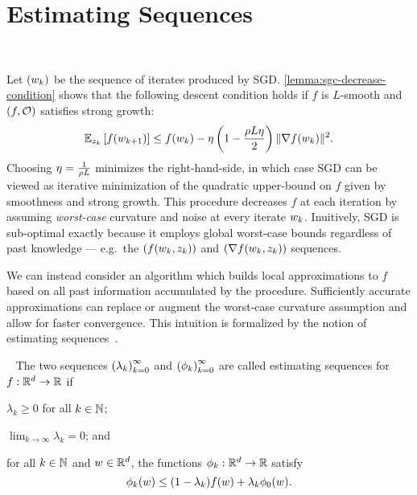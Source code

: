 \section{Estimating Sequences}~\label{sec:estimating-sequences}

Let \( \seq{\wk} \) be the sequence of iterates produced by \ac{SGD}.\@
\autoref{lemma:sgc-decrease-condition} shows that the following descent condition holds if \( f \) is \( L \)-smooth and \( \rbr{f, \oracle{}} \) satisfies strong growth:
\[ \Ek\sbr{f(\wkk)} \leq f(\wk) - \eta \rbr{1 - \frac{\sgc L \eta}{2}}\norm{\grad(\wk)}^2. \]
Choosing \( \eta = \frac{1}{\sgc L} \) minimizes the right-hand-side, in which case \ac{SGD} can be viewed as iterative minimization of the quadratic upper-bound on \( f \) given by smoothness and strong growth. 
This procedure decreases \( f \) at each iteration by assuming \emph{worst-case} curvature and noise at every iterate \( \wk \). 
Inuitively, \ac{SGD} is sub-optimal exactly because it employs global worst-case bounds regardless of past knowledge --- e.g.\ the \( \seq{f(\wk, \zk)} \) and \( \seq{\grad(\wk, \zk)} \) sequences. 

We can instead consider an algorithm which builds local approximations to \( f \) based on all past information accumulated by the procedure.
Sufficiently accurate approximations can replace or augment the worst-case curvature assumption and allow for faster convergence. 
This intuition is formalized by the notion of estimating sequences~\citep{nesterov2004lectures}.

\begin{definition}~\label{def:estimating_sequences}
    The two sequences \( \seq{\lambda_k}_{k=0}^\infty \) and \( \seq{\phi_k}_{k=0}^\infty \) are called estimating sequences for \( f : \R^d \rightarrow \R \) if
    \begin{inparaenum}[(i)]
        \item \( \lambda_k \geq 0 \) for all \( k \in \bbN \);
        \item \( \lim_{k\rightarrow \infty} \lambda_k = 0 \); and
        \item for all \( k \in \bbN \) and \( \w \in \R^d \), the functions \( \phi_k: \R^d \rightarrow \R \) satisfy
        \[ \phi_k(\w) \leq (1 - \lambda_k) f(\w) + \lambda_k \phi_0(\w). \]
    \end{inparaenum}
\end{definition}

